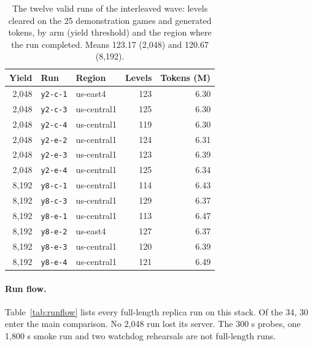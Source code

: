 \begin{table}[!htb]
\caption{The twelve valid runs of the interleaved wave: levels cleared on the 25 demonstration games and generated tokens, by arm (yield threshold) and the region where the run completed. Means 123.17 (2,048) and 120.67 (8,192).}\label{tab:interleaved}
\centering\footnotesize
\begin{tabular}{@{}rllrr@{}}
\toprule
Yield & Run & Region & Levels & Tokens (M) \\
\midrule
2,048 & \texttt{y2-c-1} & us-east4 & 123 & 6.30 \\
2,048 & \texttt{y2-c-3} & us-central1 & 125 & 6.30 \\
2,048 & \texttt{y2-c-4} & us-central1 & 119 & 6.30 \\
2,048 & \texttt{y2-e-2} & us-central1 & 124 & 6.31 \\
2,048 & \texttt{y2-e-3} & us-central1 & 123 & 6.39 \\
2,048 & \texttt{y2-e-4} & us-central1 & 125 & 6.34 \\
8,192 & \texttt{y8-c-1} & us-central1 & 114 & 6.43 \\
8,192 & \texttt{y8-c-3} & us-central1 & 129 & 6.37 \\
8,192 & \texttt{y8-e-1} & us-central1 & 113 & 6.47 \\
8,192 & \texttt{y8-e-2} & us-east4 & 127 & 6.37 \\
8,192 & \texttt{y8-e-3} & us-central1 & 120 & 6.39 \\
8,192 & \texttt{y8-e-4} & us-central1 & 121 & 6.49 \\
\bottomrule
\end{tabular}
\end{table}

\paragraph{Run flow.}
Table~\ref{tab:runflow} lists every full-length replica run on this stack. Of the 34, 30 enter the main comparison. No 2,048 run lost its server. The 300 s probes, one 1,800 s smoke run and two watchdog rehearsals are not full-length runs. %

